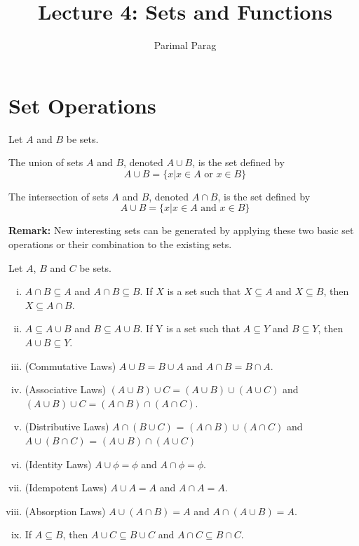 \documentclass[a4paper,english,12pt]{article}
\begin{document}
\title{Lecture 4: Sets and Functions}
\author{Parimal Parag}
\maketitle

\section{Set Operations}
Let $A$ and $B$ be sets. 
\begin{defn}[Union]
The union of sets $A$ and $B$, denoted $A \cup B$, is the set defined by 
\begin{equation*}
 A \cup B = \{ x | x \in A \text{ or } x \in B \}
\end{equation*}
\end{defn}

\begin{defn}[Intersection]
The intersection of sets $A$ and $B$, denoted $A \cap B$, is the set defined by 
\begin{equation*}
 A \cup B = \{ x | x \in A \text{ and } x \in B \}
\end{equation*}
\end{defn}

\textbf{Remark:} New interesting sets can be generated by applying these two basic set operations or their combination to the existing sets.  

\begin{thm}
 Let $A$, $B$ and $C$ be sets. 
\begin{enumerate} [i)]
\item $A \cap B \subseteq A$ and $A \cap B \subseteq B$. If $X$ is a set such that $X \subseteq A$ and $X \subseteq B$, then 
$X \subseteq A \cap B $.
\item $A \subseteq A \cup B $ and $B \subseteq A \cup B $. If Y is a set such that $A \subseteq Y$ and $B \subseteq Y$, then $A \cup B \subseteq Y$.
\item (Commutative Laws) $A \cup B = B \cup A$ and $A \cap B = B \cap A$.
\item (Associative Laws) $(A \cup B) \cup C = (A \cup B) \cup (A \cup C)$ and $(A \cup B) \cup C = (A \cap B) \cap (A \cap C)$. 
\item (Distributive Laws) $A \cap (B \cup C)$ = $(A \cap B) \cup (A \cap C)$ and $A \cup (B \cap C)$ = $(A \cup B) \cap (A \cup C)$
\item (Identity Laws) $A \cup \phi = \phi$ and $A \cap \phi = \phi$.
\item (Idempotent Laws) $A \cup A = A$ and $A \cap A = A$.
\item (Absorption Laws) $A \cup (A \cap B) = A$ and $A \cap (A \cup B) = A$.
\item If $A \subseteq B$, then $A \cup C \subseteq B \cup C$ and $A \cap C \subseteq B \cap C$.
\end{enumerate}
\end{thm}
\end{document}
